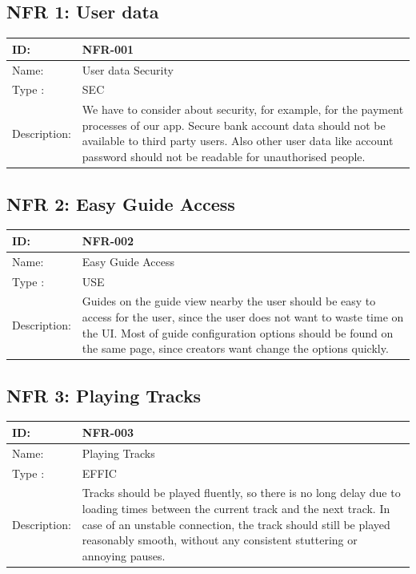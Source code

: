 \documentclass[12pt]{article}
\theoremstyle{definition}
\begin{document}
\subsection{NFR 1: User data}
    \begin{tabular}{|p{.2\linewidth}|p{.65\linewidth}|}
    \hline 
    ID: & NFR-001 \\ \hline
    Name: & User data Security \\ \hline
    Type    : & SEC \\ \hline
    Description: & We have to consider about security, for example, for the payment processes of our app. Secure bank account data should not be available to third party users. Also other user data like account password should not be readable for unauthorised people. \\ \hline
\end{tabular}

\subsection{NFR 2: Easy Guide Access}
    \begin{tabular}{|p{.2\linewidth}|p{.65\linewidth}|}
    \hline 
    ID: & NFR-002 \\ \hline
    Name: & Easy Guide Access \\ \hline
    Type    : & USE \\ \hline
    Description: & Guides on the guide view nearby the user should be easy to access for the user, since the user does not want to waste time on the UI. Most of guide configuration options should be found on the same page, since creators want change the options quickly.  \\ \hline
\end{tabular}

\subsection{NFR 3: Playing Tracks}
\begin{tabular}{|p{.2\linewidth}|p{.65\linewidth}|}
\hline 
ID: & NFR-003 \\ \hline
Name: & Playing Tracks \\ \hline
Type    : & EFFIC \\ \hline
Description: & 
Tracks should be played fluently, so there is no long delay due to loading times between the current track and the next track. In case of an unstable connection, the track should still be played reasonably smooth, without any consistent stuttering or annoying pauses. \\ \hline
\end{tabular}
\end{document}
